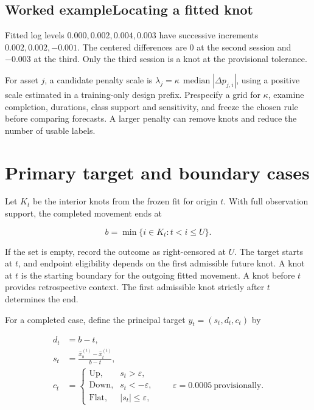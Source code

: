 \documentclass[10pt,letterpaper]{article}
\begin{document}
\subsection*{Worked example\quad Locating a fitted knot}

Fitted log levels \(0.000,0.002,0.004,0.003\) have successive increments \(0.002,0.002,-0.001\). The centered differences are \(0\) at the second session and \(-0.003\) at the third. Only the third session is a knot at the provisional tolerance.\par

For asset \(j\), a candidate penalty scale is \(\lambda_j=\kappa\,\operatorname{median}|\Delta p_{j,i}|\), using a positive scale estimated in a training-only design prefix. Prespecify a grid for \(\kappa\), examine completion, durations, class support and sensitivity, and freeze the chosen rule before comparing forecasts. A larger penalty can remove knots and reduce the number of usable labels.\par

\clearpage

\section{Primary target and boundary cases}

Let \(K_t\) be the interior knots from the frozen fit for origin \(t\). With full observation support, the completed movement ends at\par

\[
b=\min\{i\in K_t:t<i\le U\}.
\]

If the set is empty, record the outcome as right-censored at \(U\). The target starts at \(t\), and endpoint eligibility depends on the first admissible future knot. A knot at \(t\) is the starting boundary for the outgoing fitted movement. A knot before \(t\) provides retrospective context. The first admissible knot strictly after \(t\) determines the end.\par

For a completed case, define the principal target \(y_t=(s_t,d_t,c_t)\) by\par

\[
\begin{aligned}
d_t &= b-t,\\
s_t &= \frac{\widehat x^{(t)}_b-\widehat x^{(t)}_t}{b-t},\\
c_t &=
\begin{cases}
\text{Up},   & s_t>\varepsilon,\\
\text{Down}, & s_t<-\varepsilon,\\
\text{Flat}, & |s_t|\le\varepsilon,
\end{cases}
\qquad \varepsilon=0.0005\ \text{provisionally}.
\end{aligned}
\]
\end{document}
